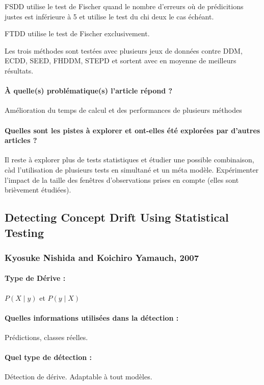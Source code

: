 \documentclass[11pt,a4paper]{report}
\begin{document}
FSDD utilise le test de Fischer quand le nombre d'erreurs où de prédicitions justes est inférieure à 5 et utilise le test du chi deux le cas échéant.

FTDD utilise le test de Fischer exclusivement.

Les trois méthodes sont testées avec plusieurs jeux de données contre DDM, ECDD, SEED, FHDDM, STEPD et sortent avec en moyenne de meilleurs résultats.
\paragraph{À quelle(s) problématique(s) l'article répond ?} Amélioration du temps de calcul et des performances de plusieurs méthodes

\paragraph{Quelles sont les pistes à explorer et ont-elles été explorées par d'autres articles ?} Il reste à explorer plus de tests statistiques et étudier une possible combinaison, càd l'utilisation de plusieurs tests en simultané et un méta modèle. Expérimenter l'impact de la taille des fenêtres d'observations prises en compte (elles sont brièvement étudiées).









\subsection{Detecting Concept Drift Using Statistical Testing}
\subsubsection{Kyosuke Nishida and Koichiro Yamauch, 2007}

\paragraph{Type de Dérive :} $P(X\mid y)$ et $P(y \mid X)$
\paragraph{Quelles informations utilisées dans la détection :} Prédictions, classes réelles.
\paragraph{Quel type de détection :} Détection de dérive. Adaptable à tout modèles.
\end{document}
